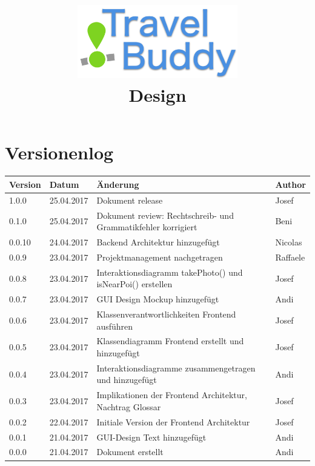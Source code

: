 \documentclass[a4paper,10pt,xetex]{article}
\title{
  \includegraphics[width=7cm]{travel-buddy_white}\\[\bigskipamount]
  Design\\[\bigskipamount]
}
\author{\documentauthors}
\date{\parbox{\linewidth}{\centering%
  IT15TA ZH \hspace*{3cm} Gruppe 3\endgraf\bigskip
  Dokumentversion \documentversion, \documentdate\endgraf
}}
\begin{document}
\maketitle\newpage

{
\hypersetup{linkcolor=black}
\setcounter{tocdepth}{3}
\renewcommand{\baselinestretch}{0.99}\normalsize
\tableofcontents
\renewcommand{\baselinestretch}{1.0}\normalsize
}

\newpage

\section{Versionenlog}\label{versionenlog}

\tabulinesep=1.2mm

\begin{longtabu} to \textwidth { | l | l | X[l] | l | }
  \hline
  \textbf{Version} & \textbf{Datum} & \textbf{Änderung} & \textbf{Author} \\
  \hline
  \endhead

  1.0.0 & 25.04.2017 & Dokument release & Josef \\
  \hline

  0.1.0 & 25.04.2017 & Dokument review: Rechtschreib- und Grammatikfehler korrigiert & Beni \\
  \hline

  0.0.10 & 24.04.2017 & Backend Architektur hinzugefügt & Nicolas \\
  \hline

  0.0.9 & 23.04.2017 & Projektmanagement nachgetragen & Raffaele \\
  \hline

  0.0.8 & 23.04.2017 & Interaktionsdiagramm takePhoto() und isNearPoi() erstellen & Josef \\
  \hline

  0.0.7 & 23.04.2017 & GUI Design Mockup hinzugefügt & Andi \\
  \hline

  0.0.6 & 23.04.2017 & Klassenverantwortlichkeiten Frontend ausführen & Josef \\
  \hline

  0.0.5 & 23.04.2017 & Klassendiagramm Frontend erstellt und hinzugefügt & Josef \\
  \hline

  0.0.4 & 23.04.2017 & Interaktionsdiagramme zusammengetragen und hinzugefügt & Andi \\
  \hline

  0.0.3 & 23.04.2017 & Implikationen der Frontend Architektur, Nachtrag Glossar & Josef \\
  \hline

  0.0.2 & 22.04.2017 & Initiale Version der Frontend Architektur & Josef \\
  \hline

  0.0.1 & 21.04.2017 & GUI-Design Text hinzugefügt & Andi\\
  \hline

  0.0.0 & 21.04.2017 & Dokument erstellt & Andi\\
  \hline
\end{longtabu}
\newpage
\end{document}
